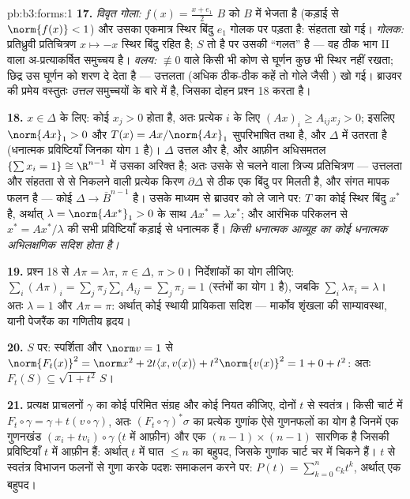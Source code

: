 \begin{solution}{pb:b3:forms:1}
\textbf{17.} \emph{विवृत गोला:} $f(x) = \frac{x + e_1}2$ $B$
को $B$ में भेजता है (कड़ाई से $\norm{f(x)} < 1$) और उसका
एकमात्र स्थिर बिंदु $e_1$ गोलक पर पड़ता है: संहतता खो गई।
\emph{गोलक:} प्रतिध्रुवी प्रतिचित्रण $x \mapsto -x$ स्थिर
बिंदु रहित है; $S$  तो है पर उसकी  ``गलत'' है
--- वह ठीक भाग II वाला अ-प्रत्याकर्षित समुच्चय है।
\emph{वलय:} $\not\equiv 0$ वाले किसी भी कोण से घूर्णन कुछ भी
स्थिर नहीं रखता; छिद्र उस घूर्णन को शरण दे देता है ---
उत्तलता (अधिक ठीक-ठीक कहें तो गोले जैसी ) खो गई।
ब्राउवर की प्रमेय वस्तुतः \emph{ उत्तल} समुच्चयों के बारे
में है, जिसका दोहन प्रश्न 18 करता है।

\textbf{18.} $x \in \Delta$ के लिए: कोई $x_j > 0$ होता है,
अतः प्रत्येक $i$ के लिए $(Ax)_i
\geq A_{ij}x_j > 0$; इसलिए $\norm{Ax}_1 > 0$ और
$T(x) = Ax/\norm{Ax}_1$ सुपरिभाषित तथा  है, और $\Delta$
में उतरता है (धनात्मक प्रविष्टियाँ जिनका योग $1$ है)।
$\Delta$ उत्तल और  है, और आफ़ीन अधिसमतल $\{\sum x_i = 1\}
\cong \R^{n-1}$ में उसका  अरिक्त है; अतः उसके 
से चलने वाला त्रिज्य प्रतिचित्रण --- उत्तलता और संहतता से
 से निकलने वाली प्रत्येक किरण $\partial\Delta$ से ठीक
एक बिंदु पर मिलती है, और संगत मापक फलन  है --- कोई
 $\Delta \to
\bar B^{n-1}$ है। उसके माध्यम से ब्राउवर को ले जाने पर: $T$
का कोई स्थिर बिंदु $x^*$ है, अर्थात् $\lambda
= \norm{Ax^*}_1 > 0$ के साथ $Ax^* = \lambda x^*$; और आरंभिक
परिकलन से $x^* = Ax^*/\lambda$ की सभी प्रविष्टियाँ कड़ाई से
धनात्मक हैं। \emph{किसी धनात्मक आव्यूह का कोई धनात्मक
अभिलक्षणिक सदिश होता है।}

\textbf{19.} प्रश्न 18 से $A\pi = \lambda\pi$, $\pi \in
\Delta$, $\pi > 0$। निर्देशांकों का योग लीजिए:
$\sum_i(A\pi)_i =
\sum_j\pi_j\sum_iA_{ij} = \sum_j\pi_j = 1$ (स्तंभों का योग
$1$ है), जबकि $\sum_i\lambda\pi_i = \lambda$। अतः $\lambda = 1$
और $A\pi = \pi$: अर्थात् कोई स्थायी प्रायिकता सदिश ---
मार्कोव शृंखला की साम्यावस्था, यानी पेजरैंक का गणितीय हृदय।

\textbf{20.} $S$ पर: स्पर्शिता और $\norm v = 1$ से
$\norm{F_t(x)}^2 = \norm x^2 +
2t\langle x, v(x)\rangle + t^2\norm{v(x)}^2 = 1 + 0 + t^2$:
अतः $F_t(S) \subseteq
\sqrt{1+t^2}\,S$।

\textbf{21.} प्रत्यक्ष प्राचलनों $\gamma$ का कोई परिमित
संग्रह और कोई  नियत कीजिए, दोनों $t$ से स्वतंत्र।
किसी चार्ट में $F_t\circ\gamma = \gamma + t(v\circ\gamma)$,
अतः $(F_t\circ\gamma)^*\sigma$ का प्रत्येक गुणांक ऐसे
गुणनफलों का योग है जिनमें एक गुणनखंड $(x_i +
tv_i)\circ\gamma$ ($t$ में आफ़ीन) और एक
$(n-1)\times(n-1)$ सारणिक है जिसकी प्रविष्टियाँ $t$ में
आफ़ीन हैं: अर्थात् $t$ में घात $\leq n$ का बहुपद, जिसके
गुणांक चार्ट चर में चिकने हैं। $t$ से स्वतंत्र विभाजन फलनों
से गुणा करके पदशः समाकलन करने पर: $P(t) = \sum_{k=0}^n
c_kt^k$, अर्थात् एक बहुपद।


\end{solution}
